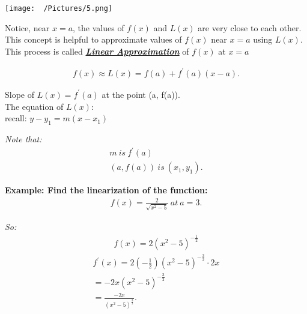 \documentclass{report}
\begin{document}
    \bigbreak \noindent \bigbreak \noindent 
    \begin{center}
      \texttt{[image:  ~/Pictures/5.png]}
    \end{center}
    \bigbreak \noindent 
    Notice, near $x = a$, the values of  $f(x)$ and  $L(x)$ are very close
    to each other. This concept is helpful to approximate values of $f(x)$ near $x=a$ 
    using $L(x)$. This process is called  \textbf{\textit{\underline{Linear Approximation}}} of
    $f(x)$ at $x=a$ 

    \bigbreak \noindent 
    \begin{align*}
      \boxed{f(x) \approx L(x) = f(a) + f^{\prime}(a)(x-a)}
    .\end{align*}

    \bigbreak \noindent 
    \begin{center}
      Slope of $L(x) = f^{\prime}(a)$ at the point (a, f(a)). \\
      The equation of $L(x):$ \\ 
      recall:  $y-y_1 = m(x-x_1)$
    \end{center}

    \bigbreak \noindent 
    \textit{Note that:}
    \begin{align*}
      m\ is\ f^{\prime}(a) \\ 
      (a, f(a))\ is\ (x_1, y_1)
    .\end{align*}

    \bigbreak \noindent 
    \begin{mdframed}
      \textbf{Example: Find the linearization of the function:}
      \begin{align*}
         f(x) = \frac{2}{\sqrt{x^{2} -5}}\ at\ a = 3 
      .\end{align*}
    \end{mdframed}

    \bigbreak \noindent 

    \bigbreak \noindent
    \textit{So:}
    \begin{align*}
      f(x) =  2(x^{2} - 5)^{-\frac{1}{2}}
    \end{align*}
    \begin{align*}
      f^{\prime}(x) = 2(-\frac{1}{2})(x^{2} -5)^{-\frac{3}{2}} \cdot 2x \\
      = -2x(x^{2} -5)^{-\frac{3}{2}} \\ 
      = \frac{-2x}{(x^{2}-5)^{\frac{3}{2}}}
    .\end{align*}
\end{document}
